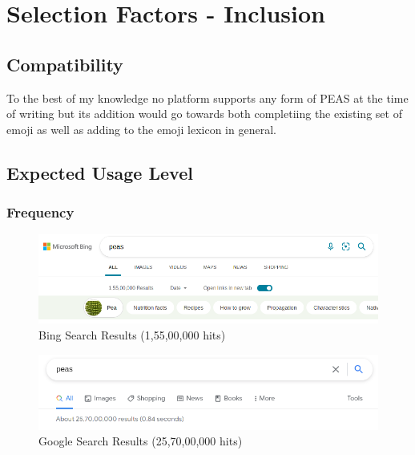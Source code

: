 \documentclass[oneside]{article}
\begin{document}
\section{Selection Factors - Inclusion}

\subsection{Compatibility}
To the best of my knowledge no platform supports any form of PEAS at
the time of writing but its addition would go towards both completiing the
existing set of emoji as well as adding to the emoji lexicon in general.

\subsection{Expected Usage Level}

\subsubsection{Frequency}

\begin{figure}[!htb]
\includegraphics[width=12cm]{bing.png}
\caption{Bing Search Results (1,55,00,000 hits)}
\label{fig:bing}
\end{figure}

\begin{figure}[!htb]
\includegraphics[width=12cm]{google.png}
\caption{Google Search Results (25,70,00,000 hits)}
\label{fig:google}
\end{figure}
\end{document}
